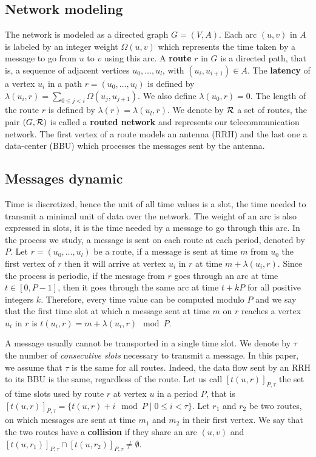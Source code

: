 \documentclass[10pt, conference, letterpaper]{IEEEtran}
\begin{document}
  \subsection{Network modeling}
  
The network is modeled as a directed graph $G=(V,A)$. Each arc  $(u,v)$ in $A$ is labeled by an integer weight $\Omega(u,v)$ which represents the time taken by a message to go from $u$ to $v$ using this arc. A {\bf route} $r$ in $G$ is a directed path, that is, a sequence of adjacent vertices $u_0, \ldots , u_{l}$, with $(u_i,u_{i+1}) \in A$.  The {\bf latency} of a vertex $u_i$ in a path $r=(u_0,\dots,u_l)$ is defined by $\lambda(u_i,r)= \sum\limits_{0 \leq j <i} \Omega(u_j, u_{j+1})$. We also define $\lambda(u_0,r)=0$. The length of the route $r$ is defined by $\lambda (r)= \lambda (u_l,r)$.
We denote by $\cal R$ a set of routes, the pair $(G,\cal R)$ is called a {\bf routed network} and represents our telecommunication network.
The first vertex of a route models an antenna (RRH) and the last one a data-center (BBU) which processes the messages sent by the antenna.

   \subsection{Messages dynamic}
	 
    Time is discretized, hence the unit of all time values is a slot, the time needed to transmit a minimal unit of data over the network. The weight of an arc is also expressed in slots, it is the time needed by a message to go through this arc.
        In the process we study, a message is sent on each route at each period, denoted by $P$.
      Let $r=(u_0,\dots,u_l)$ be a route, if a message is sent at time $m$ from $u_0$ the first vertex of $r$ then it will arrive at vertex $u_i$ in $r$ at time $m + \lambda(u_i,r)$. Since the process is periodic, if the message from $r$ goes through an arc at time $t\in [0,P-1]$, 
      then it goes through the same arc at time $t+kP$ for all positive integers $k$. Therefore, every time value can be computed modulo $P$ and we say that the first time slot at which a message sent at time $m$ on $r$ reaches a vertex $u_i$ in $r$ is $t(u_i,r) = m + \lambda(u_i,r)\mod P$. 
      
      A message usually cannot be transported in a single time slot. We denote by $\tau$ the number 
      of \emph{consecutive slots} necessary to transmit a message. In this paper, we assume that $\tau$ is the same for all routes. Indeed, the data flow sent by an RRH to its BBU is the same, regardless of the route. Let us call $[t(u,r)]_{P,\tau}$ the set of time slots used by route $r$ at vertex $u$ in a period $P$, that is $[t(u,r)]_{P,\tau} = \{t(u,r) + i \mod P \mid 0 \leq i < \tau \}$. 
      Let $r_1$ and $r_2$ be two routes, on which messages are sent at time $m_1$ and $m_2$ in their first vertex.
      We say that the two routes have a {\bf collision} if they share an arc $(u,v)$ and $[t(u,r_{1})]_{P,\tau} \cap [t(u,r_{2})]_{P,\tau} \neq \emptyset$.
      
\end{document}
